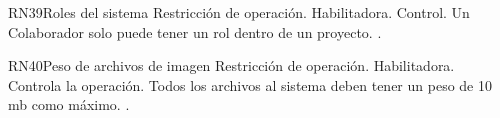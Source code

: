 \begin{BussinesRule}{RN39}{Roles del sistema} 
	\BRitem[Tipo:] Restricción de operación. 
	\BRitem[Clase:] Habilitadora. 
	\BRitem[Nivel:] Control. %
	\BRitem[Descripción:] Un Colaborador solo puede tener un rol dentro de un proyecto.
	 \UCref{}{}. 
\end{BussinesRule}

\begin{BussinesRule}{RN40}{Peso de archivos de imagen}
	\BRitem[Tipo:] Restricción de operación. 
	\BRitem[Clase:] Habilitadora. 
	\BRitem[Nivel:] Controla la operación. %
	\BRitem[Descripción:]	Todos los archivos al sistema deben tener un peso de 10 mb como máximo.
	 \UCref{}{}.
\end{BussinesRule}